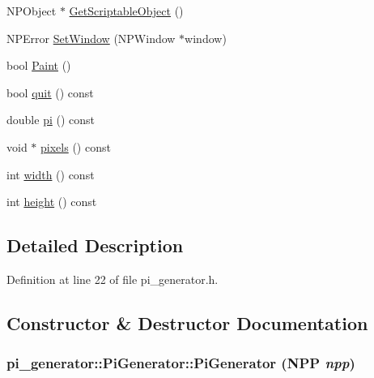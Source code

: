 \begin{DoxyCompactItemize}
\item 
NPObject $\ast$ \hyperlink{classpi__generator_1_1_pi_generator_aeb7cbec490908be34f2b269bd23fdd55}{GetScriptableObject} ()
\item 
NPError \hyperlink{classpi__generator_1_1_pi_generator_ad19c9de44971a5c08ee8e26a45598f38}{SetWindow} (NPWindow $\ast$window)
\item 
bool \hyperlink{classpi__generator_1_1_pi_generator_a47540afa1d21ef0b6e6ea7d986b71243}{Paint} ()
\item 
bool \hyperlink{classpi__generator_1_1_pi_generator_a02e8796485d878cbe8a42dcc2b204c4a}{quit} () const 
\item 
double \hyperlink{classpi__generator_1_1_pi_generator_a74119d27c1a01b50b91677f8089a0103}{pi} () const 
\item 
void $\ast$ \hyperlink{classpi__generator_1_1_pi_generator_a3e4279bb7732861b21ab6d1dcfc27429}{pixels} () const 
\item 
int \hyperlink{classpi__generator_1_1_pi_generator_ae3b2d276f4cf6209d7653f6fc4437fc4}{width} () const 
\item 
int \hyperlink{classpi__generator_1_1_pi_generator_a7cdc6f6c02a01a63e813c8357e901fb9}{height} () const 
\end{DoxyCompactItemize}


\subsection{Detailed Description}


Definition at line 22 of file pi\_\-generator.h.



\subsection{Constructor \& Destructor Documentation}
\hypertarget{classpi__generator_1_1_pi_generator_a0f5a55bbb942dee1b185447f0a7e24be}{
\subsubsection[{PiGenerator}]{\setlength{\rightskip}{0pt plus 5cm}pi\_\-generator::PiGenerator::PiGenerator (NPP {\em npp})}}
\label{classpi__generator_1_1_pi_generator_a0f5a55bbb942dee1b185447f0a7e24be}


